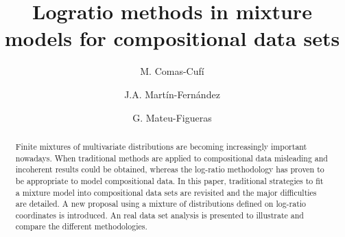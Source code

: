 \documentclass[12pt, a4paper]{article}
\title{Logratio methods in mixture models for compositional data sets}
\author[1]{M. Comas-Cufí}%
\author[1]{J.A. Martín-Fernández}
\author[1]{G. Mateu-Figueras}
\affil[1]{\small Department of Computer Science, Applied Mathematics and Statistics, Universitat de Girona}
\begin{document}
\maketitle

\newpage



\providecommand{\keywords}[1]{\textbf{Keywords:} #1}
\providecommand{\msc}[1]{\textbf{MSC2010:} #1}

\begin{abstract}
Finite mixtures of multivariate distributions are becoming increasingly important nowadays. When traditional methods are applied to compositional data misleading and incoherent results could be obtained, whereas the log-ratio methodology has proven to be appropriate to model compositional data. In this paper, traditional strategies to fit a mixture model into compositional data sets are revisited and the major difficulties are detailed. A new proposal using a mixture of distributions defined on log-ratio coordinates is introduced. An real data set analysis is presented to illustrate and compare the different methodologies.

\end{abstract}
\end{document}
